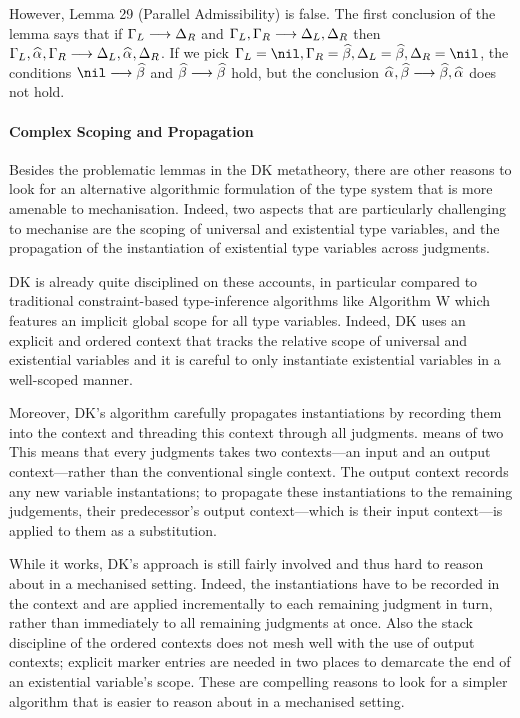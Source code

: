 However, Lemma 29 (Parallel Admissibility) is false.
The first conclusion of the lemma says that if $\Gamma_L\longrightarrow \Delta_R$ and
$\Gamma_L,\Gamma_R\longrightarrow \Delta_L,\Delta_R$ then
$\Gm_L,\al,\Gm_R\longrightarrow \Delta_L,\al,\Delta_R$.
If we pick $\Gm_L = \nil, \Gm_R = \bt, \Delta_L = \bt, \Delta_R = \nil$, the conditions
$\nil\longrightarrow \bt$ and $\bt\longrightarrow \bt$ hold, but the conclusion
$\al,\bt \longrightarrow \bt,\al$ does not hold.

\paragraph{Complex Scoping and Propagation}

Besides the problematic lemmas in the DK metatheory, there are other reasons to
look for an alternative algorithmic formulation of the type system that is more
amenable to mechanisation. Indeed, two aspects that are particularly
challenging to mechanise are the scoping of universal and existential type
variables, and the propagation of the instantiation of existential type
variables across judgments. 

DK is already quite disciplined on these accounts, in particular compared to
traditional constraint-based type-inference algorithms like Algorithm W which
features an implicit global scope for all type variables. Indeed, DK uses an
explicit and ordered context that tracks the relative scope of universal and
existential variables and it is careful to only instantiate existential
variables in a well-scoped manner.

Moreover, DK's algorithm carefully propagates instantiations by recording them
into the context and threading this context through all judgments.  means of
two This means that every judgments takes two contexts---an input and an output
context---rather than the conventional single context. The output context
records any new variable instantations; to propagate these instantiations to
the remaining judgements, their predecessor's output context---which is their
input context---is applied to them as a substitution.

While it works, DK's approach is still fairly involved and thus hard to reason
about in a mechanised setting. Indeed, the instantiations have to be recorded
in the context and are applied incrementally to each remaining judgment in
turn, rather than immediately to all remaining judgments at once. Also the
stack discipline of the ordered contexts does not mesh well with the use of
output contexts; explicit marker entries are needed in two places to
demarcate the end of an existential variable's scope. These are compelling 
reasons to look for a simpler algorithm that is easier to reason about in a 
mechanised setting.

